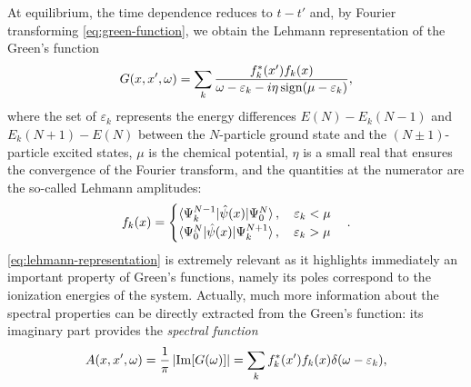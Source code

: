 At equilibrium, the time dependence reduces to $t-t'$ and, by Fourier transforming \cref{eq:green-function}, we obtain the Lehmann representation of the Green's function
%
\begin{equation}
    G(x,x',\omega) = \sum_k \frac{f_k^*(x') f_k(x)}{\omega - \varepsilon_k - i\eta \operatorname{sign}(\mu - \varepsilon_k)} ,
    \label{eq:lehmann-representation}
\end{equation}
%
where the set of $\varepsilon_k$ represents the energy differences $E(N)-E_k(N-1)$ and $E_k(N+1)-E(N)$ between the $N$-particle ground state and the $(N\pm 1)$-particle excited states, $\mu$ is the chemical potential, $\eta$ is a small real that ensures the convergence of the Fourier transform, and the quantities at the numerator are the so-called Lehmann amplitudes:
%
\begin{equation}
    f_k(x) = \begin{cases}
        \braket{\Psi^{N-1}_k|\hat{\psi}(x)|\Psi^N_0} , \quad \varepsilon_k < \mu \\
        \braket{\Psi^{N}_0|\hat{\psi}(x)|\Psi^{N+1}_k} , \quad \varepsilon_k > \mu
    \end{cases} .
    \label{eq:lehmann-amplitudes}
\end{equation}
%
\cref{eq:lehmann-representation} is extremely relevant as it highlights immediately an important property of Green's functions, namely its poles correspond to the ionization energies of the system. Actually, much more information about the spectral properties can be directly extracted from the Green's function: its imaginary part provides the \emph{spectral function}
%
\begin{equation}
    A(x,x',\omega) = \frac{1}{\pi} \left| {\rm Im}[G(\omega)] \right| = \sum_k f_k^*(x') f_k(x) \delta(\omega-\varepsilon_k) ,
    \label{eq:spectral-function}
\end{equation}
%
